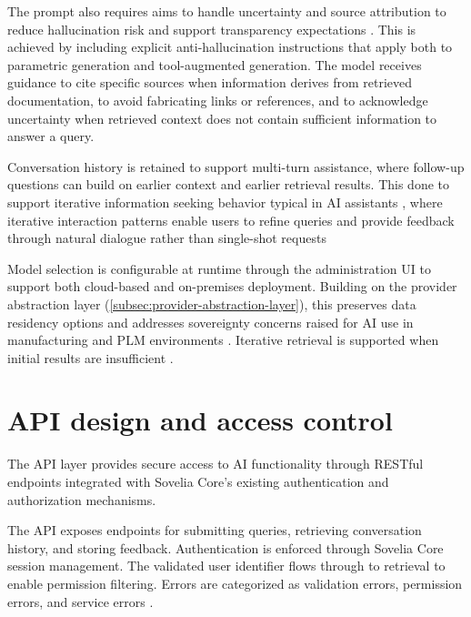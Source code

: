 The prompt also requires aims to handle uncertainty and source attribution to reduce hallucination risk and support transparency expectations \parencite{NEURIPS2020_6b493230, sillbergEUAIAct2025}. This is achieved by including explicit anti-hallucination instructions that apply both to parametric generation and tool-augmented generation. The model receives guidance to cite specific sources when information derives from retrieved documentation, to avoid fabricating links or references, and to acknowledge uncertainty when retrieved context does not contain sufficient information to answer a query.

\label{subsec:conversation-history}
Conversation history is retained to support multi-turn assistance, where follow-up questions can build on earlier context and earlier retrieval results. This done to support iterative information seeking behavior typical in AI assistants \parencite{petricekAIAssistantsFramework2023, budiu6TypesConversations2023}, where iterative interaction patterns enable users to refine queries and provide feedback through natural dialogue rather than single-shot requests

\label{subsec:model-configuration}
Model selection is configurable at runtime through the administration UI to support both cloud-based and on-premises deployment. Building on the provider abstraction layer (\autoref{subsec:provider-abstraction-layer}), this preserves data residency options and addresses sovereignty concerns raised for AI use in manufacturing and PLM environments \parencite{wangArtificialIntelligenceProduct2021}. Iterative retrieval is supported when initial results are insufficient \parencite{fengRetrievalGenerationSynergyAugmented2024}.

\section{API design and access control}
\label{sec:api-design}

The API layer provides secure access to AI functionality through RESTful endpoints integrated with Sovelia Core's existing authentication and authorization mechanisms.

The API exposes endpoints for submitting queries, retrieving conversation history, and storing feedback. Authentication is enforced through Sovelia Core session management. The validated user identifier flows through to retrieval to enable permission filtering. Errors are categorized as validation errors, permission errors, and service errors \parencite{coblenzQualitativeStudyREST2023}.

